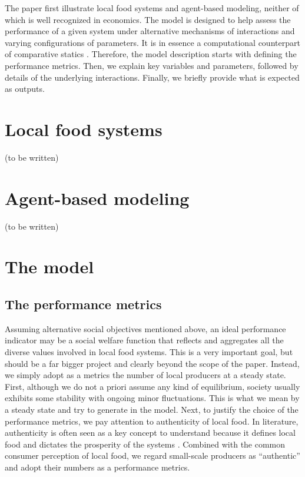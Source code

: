 \documentclass[11pt, oneside]{article}
\begin{document}
The paper first illustrate local food systems and agent-based modeling, neither of which is well recognized in economics. The model is designed to help assess the performance of a given system under alternative mechanisms of interactions and varying configurations of parameters. It is in essence a computational counterpart of comparative statics \parencite{Judd2006}. Therefore, the model description starts with defining the performance metrics. Then, we explain key variables and parameters, followed by details of the underlying interactions. Finally, we briefly provide what is expected as outputs.

\section{Local food systems}
(to be written)


\section{Agent-based modeling}
(to be written)


\section{The model}
\subsection{The performance metrics}
Assuming alternative social objectives mentioned above, an ideal performance indicator may be a social welfare function that reflects and aggregates all the diverse values involved in local food systems. This is a very important goal, but should be a far bigger project and clearly beyond the scope of the paper. Instead, we simply adopt as a metrics the number of local producers at a steady state. First, although we do not a priori assume any kind of equilibrium, society usually exhibits some stability with ongoing minor fluctuations. This is what we mean by a steady state and try to generate in the model. Next, to justify the choice of the performance metrics, we pay attention to authenticity of local food. In literature, authenticity is often seen as a key concept to understand because it defines local food and dictates the prosperity of the systems \parencite{Sims2009, Wittman2012}. Combined with the common consumer perception of local food, we regard small-scale producers as ``authentic'' and adopt their numbers as a performance metrics.
\end{document}
